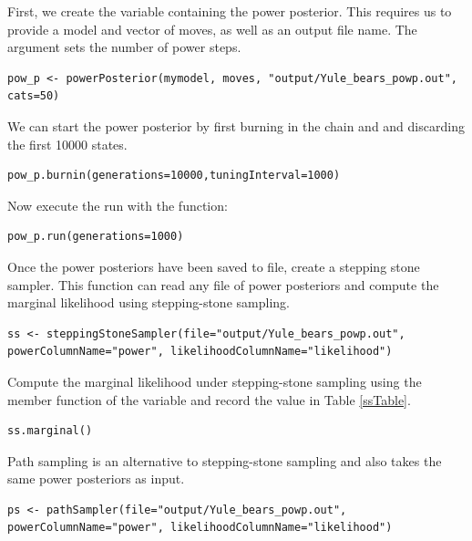 First, we create the variable containing the power posterior. This requires us to provide a model and vector of moves, as well as an output file name. The  argument sets the number of power steps.
{\tt \begin{snugshade*}
\begin{lstlisting}
pow_p <- powerPosterior(mymodel, moves, "output/Yule_bears_powp.out", cats=50) 
\end{lstlisting}
\end{snugshade*}}

We can start the power posterior by first burning in the chain and and discarding the first 10000 states.  
{\tt \begin{snugshade*}
\begin{lstlisting}
pow_p.burnin(generations=10000,tuningInterval=1000)
\end{lstlisting}
\end{snugshade*}}

Now execute the run with the  function:
{\tt \begin{snugshade*}
\begin{lstlisting}
pow_p.run(generations=1000)  
\end{lstlisting}
\end{snugshade*}}

Once the power posteriors have been saved to file, create a stepping stone sampler. This function can read any file of power posteriors and compute the marginal likelihood using stepping-stone sampling. 
{\tt \small \begin{snugshade*}
\begin{lstlisting}
ss <- steppingStoneSampler(file="output/Yule_bears_powp.out", powerColumnName="power", likelihoodColumnName="likelihood")
\end{lstlisting}
\end{snugshade*}}

Compute the marginal likelihood under stepping-stone sampling using the member function  of the  variable and record the value in Table \ref{ssTable}.
{\tt \begin{snugshade*}
\begin{lstlisting}
ss.marginal() 
\end{lstlisting}
\end{snugshade*}}

Path sampling is an alternative to stepping-stone sampling and also takes the same power posteriors as input. 
{\tt \small \begin{snugshade*}
\begin{lstlisting}
ps <- pathSampler(file="output/Yule_bears_powp.out", powerColumnName="power", likelihoodColumnName="likelihood")
\end{lstlisting}
\end{snugshade*}}

